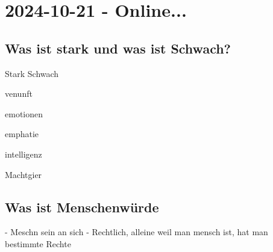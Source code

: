 \section{2024-10-21 - Online...}

\subsection{Was ist stark und was ist Schwach?}

\startplacetable[location=none]
\bTABLE
\bTR
	\bTD Stark \eTD
	\bTD Schwach \eTD
\eTR
\bTR
\bTD
	\startitemize[packed]
	\item venunft
	\item emotionen
	\item emphatie
	\item intelligenz
	\stopitemize
\eTD
\bTD
	\startitemize[packed]
	\item Machtgier
	\stopitemize
\eTD
\eTR
\eTABLE
\stopplacetable

\subsection{Was ist Menschenwürde}

- Meschn sein an sich
- Rechtlich, alleine weil man mensch ist, hat man bestimmte Rechte
